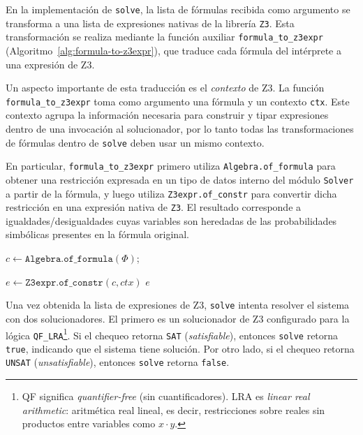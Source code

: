 En la implementación de \verb|solve|, la lista de
fórmulas recibida como argumento se transforma a una lista de
expresiones nativas de la librería \verb|Z3|. Esta transformación se
realiza mediante la función auxiliar \verb|formula_to_z3expr|
(Algoritmo~\ref{alg:formula-to-z3expr}), que traduce cada fórmula del
intérprete a una expresión de Z3.

Un aspecto importante de esta traducción es el \emph{contexto} de Z3.
La función \verb|formula_to_z3expr| toma como argumento una fórmula y un
contexto \verb|ctx|. Este contexto agrupa la información necesaria para
construir y tipar expresiones dentro de una invocación al solucionador,
por lo tanto todas las transformaciones de fórmulas dentro de
\verb|solve| deben usar un mismo contexto.

En particular, \verb|formula_to_z3expr| primero utiliza
\verb|Algebra.of_formula| para obtener una restricción expresada en un tipo de datos interno del módulo \verb|Solver| a partir
de la fórmula, y luego utiliza \verb|Z3expr.of_constr| para convertir
dicha restricción en una expresión nativa de \verb|Z3|. El resultado
corresponde a igualdades/desigualdades cuyas variables son heredadas de
las probabilidades simbólicas presentes en la fórmula original.



\begin{algorithm}[H]
\caption{\texttt{Solver.Z3solver.formula\_to\_z3expr}}
\label{alg:formula-to-z3expr}

$c \leftarrow \texttt{Algebra.of\_formula}(\Phi)$;

$e \leftarrow \texttt{Z3expr.of\_constr}(c,ctx)$ 
\Return $e$\;
\end{algorithm}


Una vez obtenida la lista de expresiones de Z3, \verb|solve| intenta
resolver el sistema con dos solucionadores. El primero es un
solucionador de Z3 configurado para la lógica
\texttt{QF\_LRA}\footnote{QF significa \emph{quantifier-free}
  (sin cuantificadores). LRA es \emph{linear real
    arithmetic}: aritmética real lineal, es decir, restricciones sobre
  reales sin productos entre
  variables como $x\cdot y$.}. Si el chequeo retorna \verb|SAT|
(\emph{satisfiable}), entonces \verb|solve| retorna \verb|true|,
indicando que el sistema tiene solución. Por otro lado, si el chequeo
retorna \verb|UNSAT| (\emph{unsatisfiable}), entonces \verb|solve|
retorna \verb|false|.

